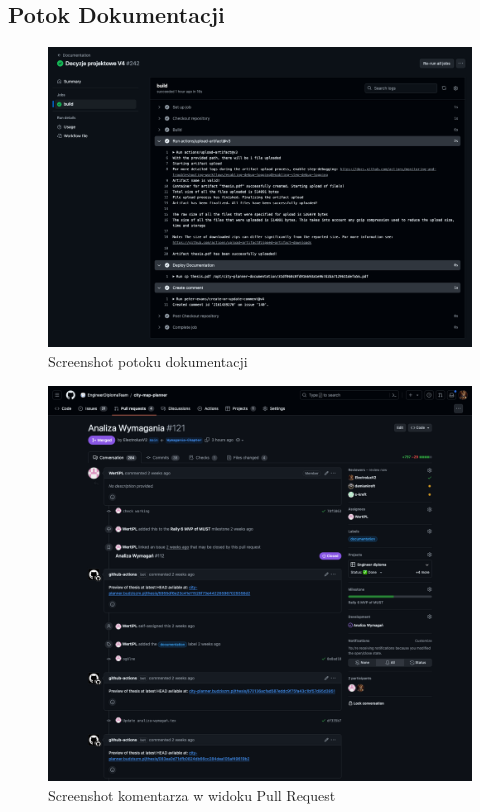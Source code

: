 \subsection{Potok Dokumentacji}
\label{subsec:potok-dokumentacji}

\begin{figure}[H]
    \centering
    \includegraphics[width=1\textwidth]{attachments/docs-ci}
    \caption{Screenshot potoku dokumentacji}
\end{figure}

\begin{figure}[H]
    \centering
    \includegraphics[width=1\textwidth]{attachments/docs-pr}
    \caption{Screenshot komentarza w widoku Pull Request}
\end{figure}

